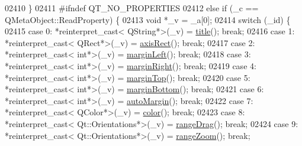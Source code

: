 \begin{DoxyCode}
02410     \}
02411 \textcolor{preprocessor}{#ifndef QT\_NO\_PROPERTIES}
02412       \textcolor{keywordflow}{else} \textcolor{keywordflow}{if} (\_c == QMetaObject::ReadProperty) \{
02413         \textcolor{keywordtype}{void} *\_v = \_a[0];
02414         \textcolor{keywordflow}{switch} (\_id) \{
02415         \textcolor{keywordflow}{case} 0: *\textcolor{keyword}{reinterpret\_cast<} QString*\textcolor{keyword}{>}(\_v) = \hyperlink{a00116_aec7f0fb0be1d3a0a946f0ded3a860d20}{title}(); \textcolor{keywordflow}{break};
02416         \textcolor{keywordflow}{case} 1: *\textcolor{keyword}{reinterpret\_cast<} QRect*\textcolor{keyword}{>}(\_v) = \hyperlink{a00116_ad1541f59ff23332e3245b74af2fd3833}{axisRect}(); \textcolor{keywordflow}{break};
02417         \textcolor{keywordflow}{case} 2: *\textcolor{keyword}{reinterpret\_cast<} \textcolor{keywordtype}{int}*\textcolor{keyword}{>}(\_v) = \hyperlink{a00116_ae58a601ccf3bfb4a4f05ad2c30cf3f7b}{marginLeft}(); \textcolor{keywordflow}{break};
02418         \textcolor{keywordflow}{case} 3: *\textcolor{keyword}{reinterpret\_cast<} \textcolor{keywordtype}{int}*\textcolor{keyword}{>}(\_v) = \hyperlink{a00116_a8e815aa0d9167e8eee7fde2b9543aeee}{marginRight}(); \textcolor{keywordflow}{break};
02419         \textcolor{keywordflow}{case} 4: *\textcolor{keyword}{reinterpret\_cast<} \textcolor{keywordtype}{int}*\textcolor{keyword}{>}(\_v) = \hyperlink{a00116_a56fe549a0ee79bcce78d4167eb47ea7b}{marginTop}(); \textcolor{keywordflow}{break};
02420         \textcolor{keywordflow}{case} 5: *\textcolor{keyword}{reinterpret\_cast<} \textcolor{keywordtype}{int}*\textcolor{keyword}{>}(\_v) = \hyperlink{a00116_aacbbba4878b8011eac2d51c346734458}{marginBottom}(); \textcolor{keywordflow}{break};
02421         \textcolor{keywordflow}{case} 6: *\textcolor{keyword}{reinterpret\_cast<} \textcolor{keywordtype}{int}*\textcolor{keyword}{>}(\_v) = \hyperlink{a00116_a2bfd7565f3ef76ca1fd87869999ae2c1}{autoMargin}(); \textcolor{keywordflow}{break};
02422         \textcolor{keywordflow}{case} 7: *\textcolor{keyword}{reinterpret\_cast<} QColor*\textcolor{keyword}{>}(\_v) = \hyperlink{a00116_ae35093fbf4f645dcefd930ca8c68b622}{color}(); \textcolor{keywordflow}{break};
02423         \textcolor{keywordflow}{case} 8: *\textcolor{keyword}{reinterpret\_cast<} Qt::Orientations*\textcolor{keyword}{>}(\_v) = \hyperlink{a00116_aa510cedc21252e5b8cf940b5414091fd}{rangeDrag}(); \textcolor{keywordflow}{break};
02424         \textcolor{keywordflow}{case} 9: *\textcolor{keyword}{reinterpret\_cast<} Qt::Orientations*\textcolor{keyword}{>}(\_v) = \hyperlink{a00116_a211b556064a5a2ebc8bf79f03d57f66c}{rangeZoom}(); \textcolor{keywordflow}{break};

\end{DoxyCode}
